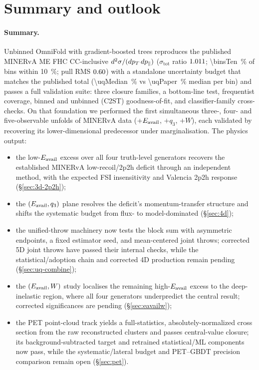 \section{Summary and outlook}
\label{sec:summary}

\paragraph{Summary.}
Unbinned OmniFold with gradient-boosted trees reproduces the published
MINERvA ME FHC CC-inclusive $d^{2}\sigma/(dp_{T}\,dp_{\parallel})$
($\sigma_{\mathrm{tot}}$ ratio $1.011$; \SI{\binsTen}{\percent} of bins within
\SI{10}{\percent}; pull RMS $0.60$) with a standalone uncertainty budget that
matches the published total (\SI{\uqMedian}{\percent} vs \SI{\uqPaper}{\percent}
median per bin) and passes a full validation suite: three closure families, a
bottom-line test, frequentist coverage, binned and unbinned (C2ST)
goodness-of-fit, and classifier-family cross-checks. On that foundation we
performed the first simultaneous three-, four- and five-observable unfolds of
MINERvA data ($+E_{\mathrm{avail}}$, $+q_{3}$, $+W$), each validated by recovering its
lower-dimensional predecessor under marginalisation. The physics output:
\begin{itemize}[itemsep=2pt]
  \item the low-$E_{\mathrm{avail}}$ excess over all four truth-level generators
        recovers the established MINERvA low-recoil/2p2h deficit through an
        independent method, with the expected FSI insensitivity and Valencia
        2p2h response (\S\ref{sec:3d-2p2h});
  \item the $(E_{\mathrm{avail}},q_{3})$ plane resolves the deficit's momentum-transfer
        structure and shifts the systematic budget from flux- to
        model-dominated (\S\ref{sec:4d});
  \item the unified-throw machinery now tests the block sum with asymmetric
        endpoints, a fixed estimator seed, and mean-centered joint throws;
        corrected 5D joint throws have passed their internal checks, while the
        statistical/adoption chain and corrected 4D production remain pending
        (\S\ref{sec:uq-combine});
  \item the $(E_{\mathrm{avail}},W)$ study localises the remaining high-$E_{\mathrm{avail}}$
        excess to the deep-inelastic region, where all four generators
        underpredict the central result; corrected significances are pending
        (\S\ref{sec:eavailw});
  \item the PET point-cloud track yields a full-statistics,
        absolutely-normalized cross section from the raw reconstructed
        clusters and passes central-value closure; its background-subtracted
        target and retrained statistical/ML components now pass, while the
        systematic/lateral budget and PET--GBDT precision comparison remain
        open (\S\ref{sec:pet}).
\end{itemize}

